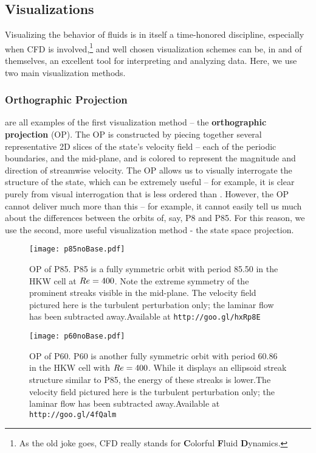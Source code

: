 \subsection{Visualizations}   

Visualizing the behavior of fluids is in itself a time-honored discipline, especially when CFD is involved,\footnote{As the old joke goes, CFD really stands for {\bf C}olorful {\bf F}luid {\bf D}ynamics.} and well chosen visualization schemes can be, in and of themselves, an excellent tool for interpreting and analyzing data. Here, we use two main visualization methods.
\subsubsection{Orthographic Projection}
 are all examples of the first visualization method -- the {\bf orthographic projection} (OP). The OP is constructed by piecing together several representative 2D slices of the state's velocity field -- each of the periodic boundaries, and the mid-plane, and is colored to represent the magnitude and direction of streamwise velocity. The OP allows us to visually interrogate the structure of the state, which can be extremely useful -- for example, it is clear purely from visual interrogation that  is less ordered than . However, the OP cannot deliver much more than this -- for example, it cannot easily tell us much about the differences between the orbits of, say, P8 and P85. For this reason, we use the second, more useful visualization method - the state space projection.
\begin{figure}
\centerline{\texttt{[image: p85noBase.pdf]}}
\caption{OP of P85. P85 is a fully symmetric orbit with period 85.50 in the HKW cell at $Re=400$. Note the extreme symmetry of the prominent streaks visible in the mid-plane. The velocity field pictured here is the turbulent perturbation only; the laminar flow has been subtracted away.{Available at {\tt http://goo.gl/hxRp8E}}}\label{fig:p85}
\end{figure}

\begin{figure}
\centerline{\texttt{[image: p60noBase.pdf]}}
\caption{OP of P60. P60 is another fully symmetric orbit with period 60.86 in the HKW cell with $Re = 400$. While it displays an ellipsoid streak structure similar to P85, the energy of these streaks is lower.The velocity field pictured here is the turbulent perturbation only; the laminar flow has been subtracted away.{Available at {\tt http://goo.gl/4fQalm}}}\label{fig:p60}
\end{figure}


